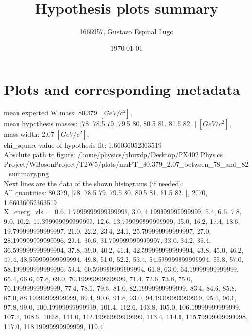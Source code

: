 \documentclass[12pt]{article}
\begin{document}
	\title{Hypothesis plots summary} %
	\author{1666957, Gustavo Espinal Lugo}
	\date{\today} %

	\maketitle
	
	\section*{Plots and corresponding metadata}
	mean expected W mass: 80.379 $[GeV/c^{2}]$,\\
mean hypothesis masses: [78.  78.5 79.  79.5 80.  80.5 81.  81.5 82. ] $[GeV/c^{2}]$,\\
mass width: 2.07 $[GeV/c^{2}]$,\\
chi\_square value of hypothesis fit: 1.66036052363519\\
	Absolute path to figure: /home/physics/phuxdp/Desktop/PX402 Physics Project/WBosonProject/T2W5/plots/muPT\_80.379\_2.07\_between\_78\_and\_82\_summary.png\\
	Next lines are the data of the shown histograms (if needed): \\
	All quantities: 	80.379, [78.  78.5 79.  79.5 80.  80.5 81.  81.5 82. ], 2070, 1.66036052363519\\
	X\_energ\_vls = [0.6, 1.7999999999999998, 3.0, 4.199999999999999, 5.4, 6.6, 7.8, 9.0, 10.2, 11.399999999999999, 12.6, 13.799999999999999, 15.0, 16.2, 17.4, 18.6, 19.799999999999997, 21.0, 22.2, 23.4, 24.6, 25.799999999999997, 27.0, 28.199999999999996, 29.4, 30.6, 31.799999999999997, 33.0, 34.2, 35.4, 36.599999999999994, 37.8, 39.0, 40.2, 41.4, 42.599999999999994, 43.8, 45.0, 46.2, 47.4, 48.599999999999994, 49.8, 51.0, 52.2, 53.4, 54.599999999999994, 55.8, 57.0, 58.199999999999996, 59.4, 60.599999999999994, 61.8, 63.0, 64.19999999999999, 65.4, 66.6, 67.8, 69.0, 70.19999999999999, 71.4, 72.6, 73.8, 75.0, 76.19999999999999, 77.4, 78.6, 79.8, 81.0, 82.19999999999999, 83.4, 84.6, 85.8, 87.0, 88.19999999999999, 89.4, 90.6, 91.8, 93.0, 94.19999999999999, 95.4, 96.6, 97.8, 99.0, 100.19999999999999, 101.4, 102.6, 103.8, 105.0, 106.19999999999999, 107.4, 108.6, 109.8, 111.0, 112.19999999999999, 113.4, 114.6, 115.79999999999998, 117.0, 118.19999999999999, 119.4]\\
\end{document}
